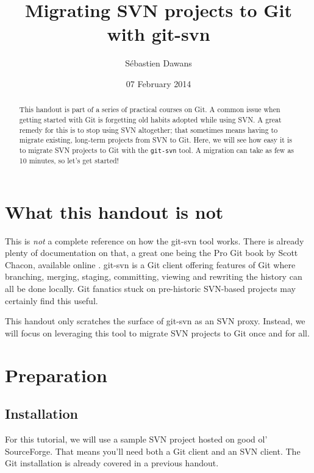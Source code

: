 \documentclass{../common/tufte-latex/tufte-handout}
\title{Migrating SVN projects to Git with git-svn}
\author{S\'ebastien Dawans}
\date{07 February 2014} %
\begin{document}
\maketitle%

\begin{abstract}
\noindent
This handout is part of a series of practical courses on Git.
A common issue when getting started with Git is forgetting old habits adopted while using SVN.
A great remedy for this is to stop using SVN altogether; that sometimes means having to migrate existing, long-term projects from SVN to Git.
Here, we will see how easy it is to migrate SVN projects to Git with the \texttt{git-svn} tool.
A migration can take as few as 10 minutes, so let's get started!
\end{abstract}

\section{What this handout is not}

This is \textit{not} a complete reference on how the git-svn tool works.
There is already plenty of documentation on that, a great one being the Pro Git book by Scott Chacon, available online \cite{git-scm-ch8}.
git-svn is a Git client offering features of Git where branching, merging, staging, committing, viewing and rewriting the history can all be done locally.
Git fanatics stuck on pre-historic SVN-based projects may certainly find this useful.

This handout only scratches the surface of git-svn as an SVN proxy.
Instead, we will focus on leveraging this tool to migrate SVN projects to Git once and for all.

\section{Preparation}

\subsection{Installation}

For this tutorial, we will use a sample SVN project hosted on good ol' SourceForge. 
That means you'll need both a Git client and an SVN client.
The Git installation is already covered in a previous handout.
\end{document}

